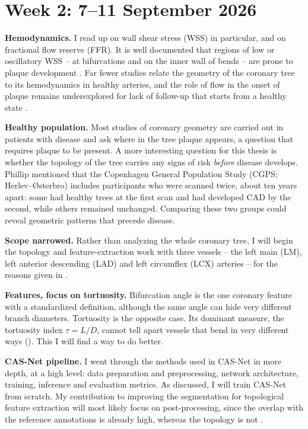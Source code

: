 \documentclass[11pt,a4paper]{article}
\begin{document}

\section{Week 2: 7--11 September 2026}


\sectionprogress

\textbf{Hemodynamics.} I read up on wall shear stress (WSS) in particular, and on fractional flow
reserve (FFR). It is well documented that regions of low or oscillatory WSS -- at bifurcations and
on the inner wall of bends -- are prone to plaque development \cite{chatzizisis2007ess,
asakura1990flow}. Far fewer studies relate the geometry of the coronary tree to its hemodynamics in
healthy arteries, and the role of flow in the onset of plaque remains underexplored for lack of
follow-up that starts from a healthy state \cite{zhang2024curvature}.

\textbf{Healthy population.} Most studies of coronary geometry are carried out in patients with
disease and ask where in the tree plaque appears, a question that requires plaque to be present. A
more interesting question for this thesis is whether the topology of the tree carries any signs of
risk \emph{before} disease develops. Phillip mentioned that the Copenhagen General Population Study
(CGPS; Herlev--{\O}sterbro) includes participants who were scanned twice, about ten years apart:
some had healthy trees at the first scan and had developed CAD by the second, while others remained
unchanged. Comparing these two groups could reveal geometric patterns that precede disease.

\textbf{Scope narrowed.} Rather than analyzing the whole coronary tree, I will begin the topology and
feature-extraction work with three vessels -- the left main (LM), left anterior descending (LAD) and
left circumflex (LCX) arteries -- for the reasons given in .

\textbf{Features, focus on tortuosity.} Bifurcation angle is the one coronary feature with a
standardized definition, although the same angle can hide very different branch diameters.
Tortuosity is the opposite case. Its dominant measure, the tortuosity index $\tau = L/D$, cannot
tell apart vessels that bend in very different ways (). This I will find a way to do better.  

\textbf{CAS-Net pipeline.} I went through the methods used in CAS-Net \cite{dong2023casnet} in more
depth, at a high level: data preparation and preprocessing, network architecture, training, inference
and evaluation metrics. As discussed, I will train CAS-Net from scratch. My contribution to improving
the segmentation for topological feature extraction will most likely focus on post-processing, since
the overlap with the reference annotations is already high, whereas the topology is not
\cite{bransby2026imagecasx}.
\end{document}
